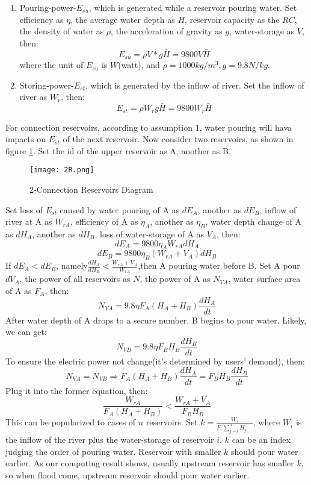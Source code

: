 \documentclass[12pt]{article}%
\begin{document}
\begin{enumerate}[1.]
	\item Pouring-power-$E_{su}$, which is generated while a reservoir pouring water. Set efficiency as $\eta$, the average water depth as $H$, reservoir capacity as the $RC$, the density of water as $\rho$, the acceleration of gravity as $g$, water-storage as $V$, then:$$E_{su}=\rho V*g \bar{H}=9800 V \bar{H}$$
where the unit of $E_{su}$ is $W$(watt), and $\rho=1000kg/m^{3},g=9.8N/kg$.
	\item Storing-power-$E_{st}$, which is generated by the inflow of river. Set the inflow of river as $W_{r}$, then:$$ E_{st} = \rho  W_{r} g \bar{H}=9800 W_{r} \bar{H}$$
\end{enumerate}
For connection reservoirs, according to assumption 1, water pouring will hava impacts on $E_{st}$ of the next reservoir. Now consider two reservoirs, as shown in figure \ref{2R}. Set the id of the upper reservoir as A, another as B.
	\begin{figure}[H]
		\centering
		\texttt{[image: 2R.png]}
		\caption{2-Connection Reservoirs Diagram}
		\label{2R}
	\end{figure}
\noindent
 Set loss of $E_{st}$ caused by water pouring of A as $dE_{A}$, another as $dE_{B}$, inflow of river at A as $W_{rA}$, efficiency of A as $\eta_{A}$, another as $\eta_{B}$, water depth change of A as $dH_{A}$, another as  $dH_{B}$, loss of water-storage of A as $V_{A}$, then:
$$dE_{A}=9800 \eta_{A} W_{rA} dH_{A}$$
$$dE_{B}=9800 \eta_{B} (W_{rA}+V_{A}) dH_{B}$$
If $dE_{A}<dE_{B}$, namely$\frac{dH_{A}}{dH_{B}}<\frac{W_{rA}+V_{A}}{W_{rA}}$,then 
A pouring water before B. Set A pour $dV_{A}$, the power of all reservoirs as $N$, the power of A as $N_{VA}$, water surface area of A as $F_{A}$, then:
$$N_{VA} = 9.8 \eta F_{A} (H_{A}+H_{B}) \frac{dH_{A}}{dt}$$
After water depth of A drops to a secure number, B begins to pour water. Likely, we can get:
$$N_{VB} = 9.8 \eta F_{B} H_{B} \frac{dH_{B}}{dt}$$
To ensure the electric power not change(it's determined by users' demond), then:
$$N_{VA}=N_{VB}\Rightarrow F_{A}(H_{A}+H_{B})\frac{dH_{A}}{dt}=F_{B} H_{B}\frac{dH_{B}}{dt}$$
Plug it into the former equation, then:
$$\frac{W_{rA}}{F_{A}(H_{A}+H_{B})}<\frac{W_{rA}+V_{A}}{F_{B}H_{B}}$$
This can be popularized to cases of $n$ reservoirs. Set $k=\frac{W_{i}}{F_{i} \sum_{j=i}^{n} H_{j}\quad}$, where $W_{i}$ is the inflow of the river plus the water-storage of reservoir $i$. $k$ can be an index judging the order of pouring water. Reservoir with smaller $k$ should pour water earlier. As our computing result shows, usually upstream reservoir has smaller $k$, so when flood come, upstream reservoir should pour water earlier.
\end{document}
